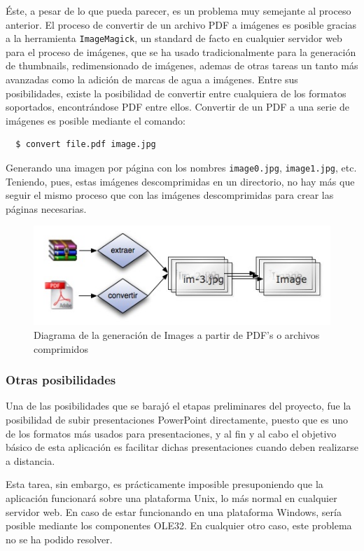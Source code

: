 Éste, a pesar de lo que pueda parecer, es un problema muy semejante al proceso anterior. El proceso de convertir de un archivo PDF a imágenes es posible gracias a la herramienta \texttt{ImageMagick}, un standard de facto en cualquier servidor web para el proceso de imágenes, que se ha usado tradicionalmente para la generación de thumbnails, redimensionado de imágenes, ademas de otras tareas un tanto más avanzadas como la adición de marcas de agua a imágenes. Entre sus posibilidades, existe la posibilidad de convertir entre cualquiera de los formatos soportados, encontrándose PDF entre ellos. Convertir de un PDF a una serie de imágenes es posible mediante el comando:

\begin{verbatim}
  $ convert file.pdf image.jpg
\end{verbatim}

Generando una imagen por página con los nombres \texttt{image0.jpg}, \texttt{image1.jpg}, etc. Teniendo, pues, estas imágenes descomprimidas en un directorio, no hay más que seguir el mismo proceso que con las imágenes descomprimidas para crear las páginas necesarias.

\begin{figure}[h!]
\centering
\includegraphics[totalheight=5cm]{converter.jpg}
\caption{Diagrama de la generación de Images a partir de PDF's o archivos comprimidos}\label{fig:converter}
\end{figure}



\subsubsection{Otras posibilidades} %
\label{ssub:otras_posibilidades}

Una de las posibilidades que se barajó el etapas preliminares del proyecto, fue la posibilidad de subir presentaciones PowerPoint directamente, puesto que es uno de los formatos más usados para presentaciones, y al fin y al cabo el objetivo básico de esta aplicación es facilitar dichas presentaciones cuando deben realizarse a distancia.

Esta tarea, sin embargo, es prácticamente imposible presuponiendo que la aplicación funcionará sobre una plataforma Unix, lo más normal en cualquier servidor web. En caso de estar funcionando en una plataforma Windows, sería posible mediante los componentes OLE32. En cualquier otro caso, este problema no se ha podido resolver.



